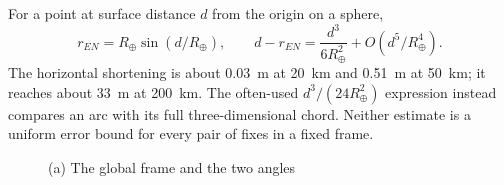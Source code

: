 For a point at surface distance $d$ from the origin on a sphere,
\begin{equation}
 r_{EN}=R_\oplus\sin(d/R_\oplus),\qquad
 d-r_{EN}=\frac{d^3}{6R_\oplus^2}+O(d^5/R_\oplus^4).
 \label{eq:enu-projection-error}
\end{equation}
The horizontal shortening is about \SI{0.03}{\metre} at \SI{20}{\kilo\metre} and
\SI{0.51}{\metre} at \SI{50}{\kilo\metre}; it reaches about \SI{33}{\metre} at
\SI{200}{\kilo\metre}. The often-used $d^3/(24R_\oplus^2)$ expression instead compares
an arc with its full three-dimensional chord. Neither estimate is a uniform error
bound for every pair of fixes in a fixed frame.

\begin{figure}[htbp]
  \centering
  \begin{minipage}[t]{0.57\linewidth}
    \raggedright
    {\sffamily\small (a) The global frame and the two angles}\\[4pt]
    \centering
\end{minipage}
\end{figure}
